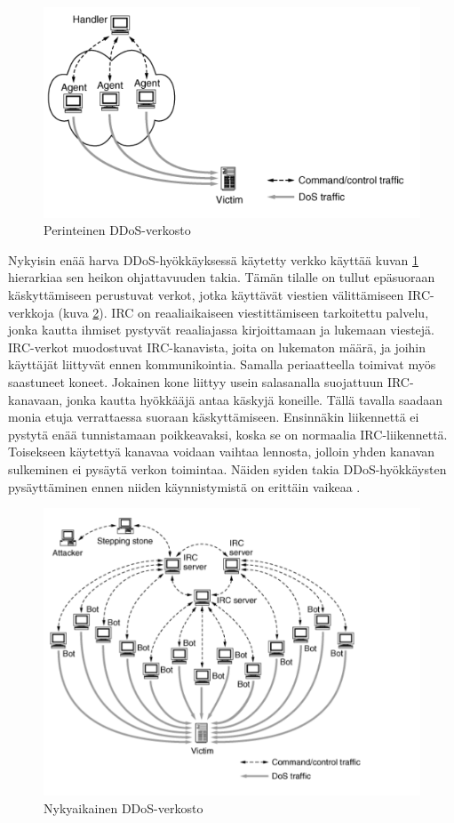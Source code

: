 \begin{figure}[htp]
\centering
\includegraphics[width=12cm]{pics/ddos1.pdf}
\caption{Perinteinen DDoS-verkosto}
\label{ddos1}
\end{figure}

Nykyisin enää harva DDoS-hyökkäyksessä käytetty verkko käyttää kuvan \ref{ddos1}
hierarkiaa sen heikon ohjattavuuden takia. Tämän tilalle on tullut
epäsuoraan käskyttämiseen perustuvat verkot, jotka käyttävät viestien
välittämiseen IRC-verkkoja (kuva \ref{ddos2}). IRC on reaaliaikaiseen viestittämiseen
tarkoitettu palvelu, jonka kautta ihmiset pystyvät reaaliajassa kirjoittamaan
ja lukemaan viestejä. IRC-verkot muodostuvat IRC-kanavista, joita on lukematon
määrä, ja joihin käyttäjät liittyvät ennen kommunikointia. Samalla
periaatteella toimivat myös saastuneet koneet. Jokainen kone liittyy usein
salasanalla suojattuun IRC-kanavaan, jonka kautta hyökkääjä antaa käskyjä
koneille. Tällä tavalla saadaan monia etuja verrattaessa suoraan käskyttämiseen.
Ensinnäkin liikennettä ei pystytä enää tunnistamaan poikkeavaksi, koska se on
normaalia IRC-liikennettä. Toisekseen käytettyä kanavaa voidaan vaihtaa
lennosta, jolloin yhden kanavan sulkeminen ei pysäytä verkon toimintaa. Näiden
syiden takia DDoS-hyökkäysten pysäyttäminen ennen niiden käynnistymistä on
erittäin vaikeaa \cite{DDOS}.

\begin{figure}[htp]
\centering
\includegraphics[width=12cm]{pics/ddos2.pdf}
\caption{Nykyaikainen DDoS-verkosto}
\label{ddos2}
\end{figure}

